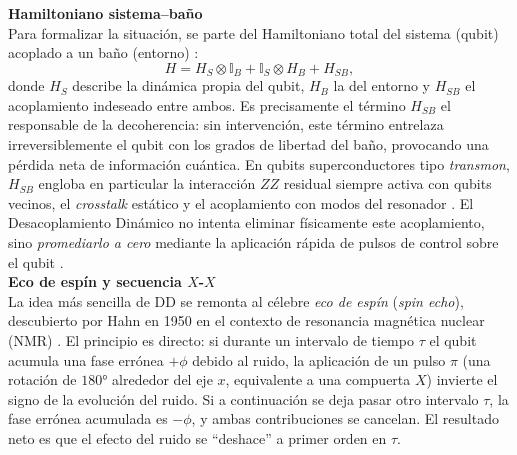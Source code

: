 \documentclass[12pt, spanish]{book}
\begin{document}
\textbf{Hamiltoniano sistema--baño}\\

Para formalizar la situación, se parte del Hamiltoniano total del sistema (qubit) acoplado a un baño (entorno) \cite{ViolaKnillLloyd1999, Ezzell2023}:
\begin{equation}
    H = H_S \otimes \mathbb{I}_B + \mathbb{I}_S \otimes H_B + H_{SB},
    \label{eq:hamiltoniano_total_dd}
\end{equation}
donde $H_S$ describe la dinámica propia del qubit, $H_B$ la del entorno y $H_{SB}$ el acoplamiento indeseado entre ambos. Es precisamente el término $H_{SB}$ el responsable de la decoherencia: sin intervención, este término entrelaza irreversiblemente el qubit con los grados de libertad del baño, provocando una pérdida neta de información cuántica. En qubits superconductores tipo \textit{transmon}, $H_{SB}$ engloba en particular la interacción $ZZ$ residual siempre activa con qubits vecinos, el \textit{crosstalk} estático y el acoplamiento con modos del resonador \cite{Ezzell2023, AbuGhanem2025}. El Desacoplamiento Dinámico no intenta eliminar físicamente este acoplamiento, sino \textit{promediarlo a cero} mediante la aplicación rápida de pulsos de control sobre el qubit \cite{ViolaKnillLloyd1999}.\\

\textbf{Eco de espín y secuencia $X$-$X$}\\

La idea más sencilla de DD se remonta al célebre \textit{eco de espín} (\textit{spin echo}), descubierto por Hahn en 1950 en el contexto de resonancia magnética nuclear (NMR) \cite{Hahn1950}. El principio es directo: si durante un intervalo de tiempo $\tau$ el qubit acumula una fase errónea $+\phi$ debido al ruido, la aplicación de un pulso $\pi$ (una rotación de $180°$ alrededor del eje $x$, equivalente a una compuerta $X$) invierte el signo de la evolución del ruido. Si a continuación se deja pasar otro intervalo $\tau$, la fase errónea acumulada es $-\phi$, y ambas contribuciones se cancelan. El resultado neto es que el efecto del ruido se ``deshace'' a primer orden en $\tau$.\\
\end{document}
